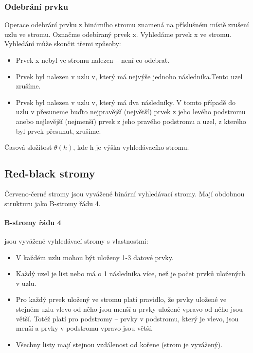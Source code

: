 \documentclass[10pt,a4paper]{article}
\begin{document}
\subsubsection{Odebrání prvku}
Operace odebrání prvku z binárního stromu znamená na příslušném místě zrušení uzlu ve stromu. Označme odebíraný prvek x. Vyhledáme prvek x ve stromu. Vyhledání může skončit třemi způsoby:
\begin{itemize}
	\item Prvek x nebyl ve stromu nalezen – není co odebrat.
	\item Prvek byl nalezen v uzlu v, který má nejvýše jednoho následníka.Tento uzel zrušíme.
	\item Prvek byl nalezen v uzlu v, který má dva následníky. V tomto případě do uzlu v přesuneme buďto nejpravější (největší) prvek z jeho levého podstromu anebo nejlevější (nejmenší) prvek z jeho pravého podstromu a uzel, z kterého byl prvek přesunut, zrušíme.
\end{itemize}
Časová složitost $\theta(h)$, kde h je výška vyhledávacího stromu.




\subsection{Red-black stromy}
Červeno-černé stromy jsou vyvážené binární vyhledávací stromy. Mají obdobnou strukturu jako B-stromy řádu 4.
\paragraph{B-stromy řádu 4}
jsou vyvážené vyhledávací stromy s vlastnostmi:
\begin{itemize}
	\item V každém uzlu mohou být uloženy 1-3 datové prvky.
	\item Každý uzel je list nebo má o 1 následníka více, než je počet prvků uložených v uzlu.
	\item Pro každý prvek uložený ve stromu platí pravidlo, že prvky uložené ve stejném uzlu vlevo od něho jsou menší a prvky uložené vpravo od něho jsou větší. Totéž platí pro podstromy – prvky v podstromu, který je vlevo, jsou menší a prvky v podstromu vpravo jsou větší.
	\item Všechny listy mají stejnou vzdálenost od kořene (strom je vyvážený).
\end{itemize}
\end{document}
